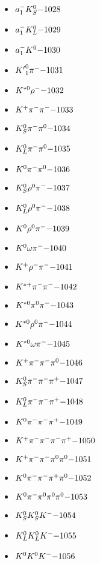 \begin{multicols}{3}
\begin{itemize}
 \item $ a_{1}^{-} K_{S}^{0} \hfill{-1028}$
 \item $ a_{1}^{-} K_{L}^{0} \hfill{-1029}$
 \item $ a_{1}^{-} K^{0} \hfill{-1030}$
 \item $ {K^{\prime}}_{1}^{0} \pi^{-} \hfill{-1031}$
 \item $ K^{*0} \rho^{-} \hfill{-1032}$
 \item $ K^{+} \pi^{-} \pi^{-} \hfill{-1033}$
 \item $ K_{S}^{0} \pi^{-} \pi^{0} \hfill{-1034}$
 \item $ K_{L}^{0} \pi^{-} \pi^{0} \hfill{-1035}$
 \item $ K^{0} \pi^{-} \pi^{0} \hfill{-1036}$
 \item $ K_{S}^{0} \rho^{0} \pi^{-} \hfill{-1037}$
 \item $ K_{L}^{0} \rho^{0} \pi^{-} \hfill{-1038}$
 \item $ K^{0} \rho^{0} \pi^{-} \hfill{-1039}$
 \item $ K^{0} \omega \pi^{-} \hfill{-1040}$
 \item $ K^{+} \rho^{-} \pi^{-} \hfill{-1041}$
 \item $ K^{*+} \pi^{-} \pi^{-} \hfill{-1042}$
 \item $ K^{*0} \pi^{0} \pi^{-} \hfill{-1043}$
 \item $ K^{*0} \rho^{0} \pi^{-} \hfill{-1044}$
 \item $ K^{*0} \omega \pi^{-} \hfill{-1045}$
 \item $ K^{+} \pi^{-} \pi^{-} \pi^{0} \hfill{-1046}$
 \item $ K_{S}^{0} \pi^{-} \pi^{-} \pi^{+} \hfill{-1047}$
 \item $ K_{L}^{0} \pi^{-} \pi^{-} \pi^{+} \hfill{-1048}$
 \item $ K^{0} \pi^{-} \pi^{-} \pi^{+} \hfill{-1049}$
 \item $ K^{+} \pi^{-} \pi^{-} \pi^{-} \pi^{+} \hfill{-1050}$
 \item $ K^{+} \pi^{-} \pi^{-} \pi^{0} \pi^{0} \hfill{-1051}$
 \item $ K^{0} \pi^{-} \pi^{-} \pi^{+} \pi^{0} \hfill{-1052}$
 \item $ K^{0} \pi^{-} \pi^{0} \pi^{0} \pi^{0} \hfill{-1053}$
 \item $ K_{S}^{0} K_{S}^{0} K^{-} \hfill{-1054}$
 \item $ K_{L}^{0} K_{L}^{0} K^{-} \hfill{-1055}$
 \item $ K^{0} K^{0} K^{-} \hfill{-1056}$

\end{itemize}
\end{multicols}

